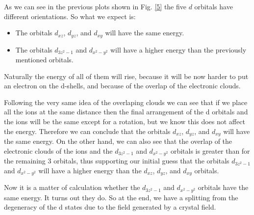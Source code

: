 \begin{questions}

\begin{solution}
As we can see in the previous plots shown in Fig. \ref{5} the five $d$ orbitals have different orientations. So what we expect is:
  \begin{itemize}
    \item The orbitals $d_{xz}$, $d_{yz}$, and $d_{xy}$ will have the same energy.
    \item The orbitals $d_{3z^2-1}$ and $d_{x^2-y^2}$ will have a higher energy than the previously mentioned orbitals.
  \end{itemize}
  Naturally the energy of all of them will rise, because it will be now harder to put an electron on the d-shells, and because of the overlap of the electronic clouds.

  Following the very same idea of the overlaping clouds we can see that if we place all the ions at the same distance then the final arrangement of the d orbitals and the ions will be the same except for a rotation, but we know this does not affect the energy. Therefore we can conclude that the orbitals $d_{xz}$, $d_{yz}$, and $d_{xy}$ will have the same energy. On the other hand, we can also see that the overlap of the electronic clouds of the ions and the $d_{3z^2-1}$ and $d_{x^2-y^2}$ orbitals is greater than for the remaining 3 orbitals, thus supporting our initial guess that the orbitals $d_{3z^2-1}$ and $d_{x^2-y^2}$ will have a higher energy than the $d_{xz}$, $d_{yz}$, and $d_{xy}$ orbitals.

  Now it is a matter of calculation whether the $d_{3z^2-1}$ and $d_{x^2-y^2}$ orbitals have the same energy. It turns out they do. So at the end, we have a splitting from the degeneracy of the d states due to the field generated by a crystal field.
\end{solution}

\end{questions}
